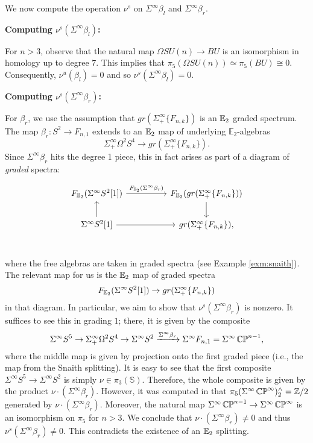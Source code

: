 We now compute the operation $\nu^s$ on $\Sigma^{\infty} \beta_l$ and $\Sigma^{\infty} \beta_r$.  

\textbf{Computing $\nu^s(\Sigma^{\infty}\beta_l)$:}

For $n>3$, observe that the natural map $\Omega SU(n) \to BU$ is an isomorphism in homology up to degree $7$.  This implies that $\pi_5(\Omega SU(n)) \simeq \pi_5(BU) \cong 0$.  Consequently, $\nu^u(\beta_l) = 0$ and so $\nu^s(\Sigma^{\infty} \beta_l) = 0.$  

\textbf{Computing $\nu^s(\Sigma^{\infty}\beta_r)$:}

For $\beta_r$, we use the assumption that $gr(\Sigma^{\infty}_+ \{ F_{n,k} \})$ is an $\operatorname{\mathbb{E}}_2$ graded spectrum.  The map $\beta_r: S^2 \to F_{n,1}$ extends to an $\operatorname{\mathbb{E}}_2$ map of underlying $\mathbb{E}_2$-algebras $$\Sigma^{\infty}_+ \Omega^2 S^4 \to  gr(\Sigma^{\infty}_+ \{ F_{n,k} \}).$$  Since $\Sigma^{\infty} \beta_r$ hits the degree 1 piece, this in fact arises as part of a diagram of \emph{graded} spectra:

$$
\begin{tikzcd}
 F_{\E_2}(\Sigma^{\infty}S^2[1])\arrow[rr,"F_{\E_2}(\Sigma^{\infty} \beta_r)"]& & F_{\E_2}(gr(\Sigma^{\infty}_+ \{ F_{n,k}\} ))\arrow[d]\\
 \Sigma^{\infty}S^2[1] \arrow[rr] \arrow[u]&& gr(\Sigma^{\infty}_+ \{ F_{n,k} \} ), \\ 
\end{tikzcd}
$$

where the free algebras are taken in graded spectra (see Example \ref{exm:snaith}).  The relevant map for us is the $\operatorname{\mathbb{E}}_2$ map of graded spectra $$F_{\operatorname{\mathbb{E}}_2}(\Sigma^\infty S^2[1]) \to gr(\Sigma^{\infty}_+ \{ F_{n,k} \})$$ in that diagram.  In particular, we aim to show that $\nu^s(\Sigma^\infty \beta_r)$ is nonzero. It suffices to see this in grading $1$; there, it is given by the composite $$\Sigma^{\infty} S^5 \to \Sigma^{\infty}_+ \Omega^2 S^4 \to \Sigma^{\infty} S^2 \xrightarrow{\Sigma^{\infty} \beta_r} \Sigma^{\infty} F_{n,1} =\Sigma^{\infty} \operatorname{\mathbb{CP}}^{n-1},$$ where the middle map is given by projection onto the first graded piece (i.e., the map from the Snaith splitting).  It is easy to see that the first composite $\Sigma^{\infty} S^5 \to \Sigma^{\infty} S^2$ is simply $\nu \in \pi_3(\mathbb{S}).$  Therefore, the whole composite is given by the product $\nu\cdot (\Sigma^{\infty} \beta_r).$  
However, it was computed in \cite[Theorem II.8]{Liulevicius} that $\pi_5(\Sigma^{\infty}\operatorname{\mathbb{CP}}^{\infty})^{\wedge}_2=\mathbb{Z}/2$ generated by $\nu \cdot (\Sigma^{\infty}\beta_r).$  Moreover, the natural map $\Sigma^{\infty}\operatorname{\mathbb{CP}}^{n-1} \to \Sigma^{\infty}\operatorname{\mathbb{CP}}^\infty$ is an isomorphism on $\pi_5$ for $n>3$.  We conclude that $\nu \cdot (\Sigma^{\infty}\beta_r )\neq 0$ and thus $\nu^s(\Sigma^{\infty} \beta_r) \neq 0$.  This contradicts the existence of an $\operatorname{\mathbb{E}}_2$ splitting.   


